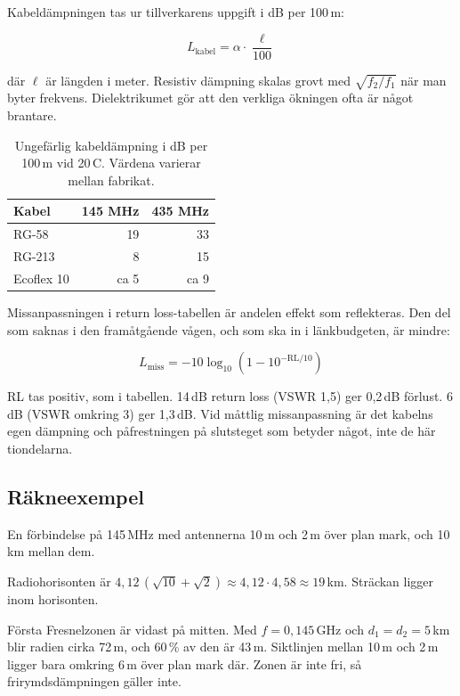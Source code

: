 Kabeldämpningen tas ur tillverkarens uppgift i dB per 100\,m:

\begin{equation}
	L_{\mathrm{kabel}} = \alpha \cdot \frac{\ell}{100}
\end{equation}

där $\ell$ är längden i meter. Resistiv dämpning skalas grovt med
$\sqrt{f_2/f_1}$ när man byter frekvens. Dielektrikumet gör att den
verkliga ökningen ofta är något brantare.

\begin{table}[H]
	\centering
	\begin{tabular}{lrr}
		\textbf{Kabel} & \textbf{145 MHz} & \textbf{435 MHz} \\ \hline
		RG-58 & 19 & 33 \\
		RG-213 & 8 & 15 \\
		Ecoflex 10 & ca 5 & ca 9 \\
	\end{tabular}
	\caption{Ungefärlig kabeldämpning i dB per 100\,m vid 20\,\textdegree C.
		Värdena varierar mellan fabrikat.}
	\label{tab:kabeldämpning}
\end{table}

Missanpassningen i return loss-tabellen är andelen effekt som reflekteras.
Den del som saknas i den framåtgående vågen, och som ska in i
länkbudgeten, är mindre:

\begin{equation}
	L_{\mathrm{miss}} = -10\log_{10}\!\left(1 - 10^{-\mathrm{RL}/10}\right)
\end{equation}

RL tas positiv, som i tabellen. 14\,dB return loss (VSWR 1,5) ger
0,2\,dB förlust. 6\,dB (VSWR omkring 3) ger 1,3\,dB. Vid måttlig
missanpassning är det kabelns egen dämpning och påfrestningen på slutsteget
som betyder något, inte de här tiondelarna.


\subsection{Räkneexempel}

En förbindelse på 145\,MHz med antennerna 10\,m och 2\,m över plan mark,
och 10\,km mellan dem.

Radiohorisonten är
$4,12\,(\sqrt{10}+\sqrt{2}) \approx 4,12 \cdot 4,58 \approx 19$\,km.
Sträckan ligger inom horisonten.

Första Fresnelzonen är vidast på mitten. Med $f = 0,145$\,GHz och
$d_1 = d_2 = 5$\,km blir radien cirka 72\,m, och 60\,\% av den är 43\,m.
Siktlinjen mellan 10\,m och 2\,m ligger bara omkring 6\,m över plan mark
där. Zonen är inte fri, så frirymdsdämpningen gäller inte.

